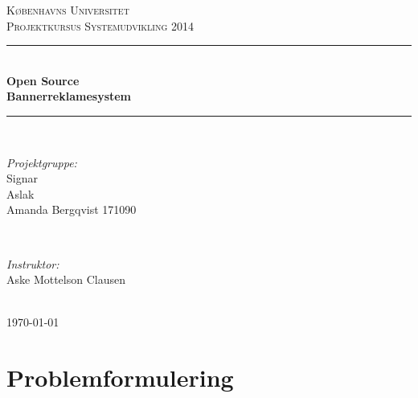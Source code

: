 \documentclass[a4paper,12pt]{article}
\begin{document}
\begin{titlepage}


\newcommand{\HRule}{\rule{\linewidth}{0.5mm}} %

\center %

\textsc{\LARGE Københavns Universitet}\\[1.5cm] %
\textsc{\Large Projektkursus Systemudvikling 2014}\\[0.5cm] %

\HRule \\[0.4cm]
{  \bfseries \large Open Source \\ \huge Bannerreklamesystem}\\[0.4cm] %
\HRule \\[1.5cm]

\begin{minipage}{0.4\textwidth}
\begin{flushleft} \large
\emph{Projektgruppe:}
\newline
\\
Signar %
\newline
\\
Aslak
\newline
\\
Amanda Bergqvist 171090
\end{flushleft}
\end{minipage}
~
\begin{minipage}{0.4\textwidth}
\begin{flushright} \large
\emph{Instruktor:} \\
Aske Mottelson Clausen %
\end{flushright}
\end{minipage}\\[4cm]

{\large \today}\\[3cm] %

\end{titlepage}

\tableofcontents %
\newpage


\clearpage %

\section{Problemformulering}
\end{document}
